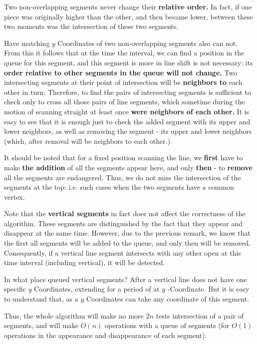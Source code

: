 Two non-overlapping segments never change their \textbf{relative order.}
In fact, if one piece was originally higher than the other, and then became lower, between these two moments was the intersection of these two segments.

Have matching $y$ Coordinates of two non-overlapping segments also can not.
From this it follows that at the time the interval, we can find a position in the queue for this segment, and this segment is more in line shift is not necessary: ​​its \textbf{order relative to other segments in the queue will not change.}
Two intersecting segments at their point of intersection will be \textbf{neighbors to} each other in turn.
Therefore, to find the pairs of intersecting segments is sufficient to check only to cross all those pairs of line segments, which sometime during the motion of scanning straight at least once \textbf{were neighbors of each other.}
It is easy to see that it is enough just to check the added segment with its upper and lower neighbors, as well as removing the segment - its upper and lower neighbors (which, after removal will be neighbors to each other.)

It should be noted that for a fixed position scanning the line, we \textbf{first} have to make \textbf{the addition} of all the segments appear here, and only \textbf{then} - to \textbf{remove} all the segments are endangered.
Thus, we do not miss the intersection of the segments at the top: i.e. such cases when the two segments have a common vertex.

Note that the \textbf{vertical segments} in fact does not affect the correctness of the algorithm.
These segments are distinguished by the fact that they appear and disappear at the same time. However, due to the previous remark, we know that the first all segments will be added to the queue, and only then will be removed. Consequently, if a vertical line segment intersects with any other open at this time interval (including vertical), it will be detected.

In what place queued vertical segments? After a vertical line does not have one specific $y$ Coordinates, extending for a period of at $y$ -Coordinate. But it is easy to understand that, as a $y$ Coordinates can take any coordinate of this segment.

Thus, the whole algorithm will make no more $2n$ tests intersection of a pair of segments, and will make $O (n)$ operations with a queue of segments (for $O (1)$ operations in the appearance and disappearance of each segment).

